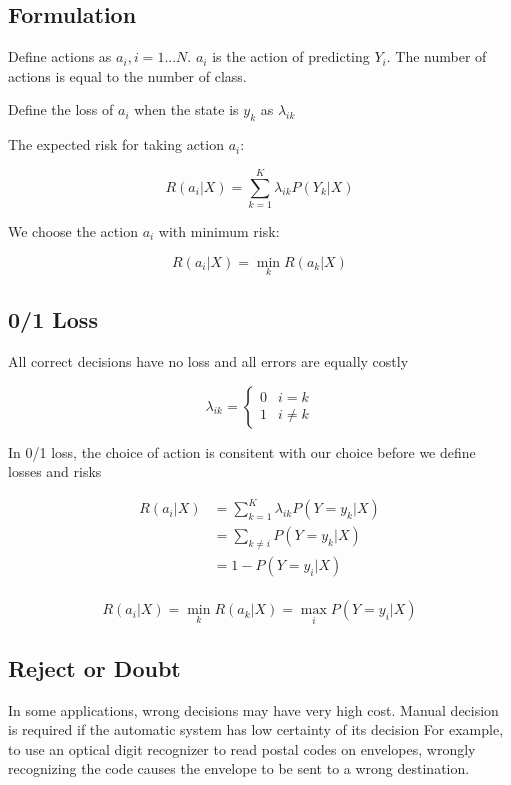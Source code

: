 \begin{multicols}{2}
\subsection{Formulation}

\noindent Define actions as $a_{i}, i=1...N$. $a_{i}$ is the action of predicting $Y_{i}$. The number of actions is equal to the number of class. 

\noindent Define the loss of $a_{i}$ when the state is $y_{k}$ as $\lambda_{ik}$

\noindent The expected risk for taking action $a_{i}$:

$$R(a_{i} | X) = \sum^{K}_{k=1} \lambda_{ik} P(Y_{k} | X)$$

\noindent We choose the action $a_{i}$ with minimum risk:

$$R(a_{i}|X) = \!\min_{k} R(a_{k}|X)$$

\subsection{0/1 Loss}

\noindent All correct decisions have no loss and all errors are equally costly

$$
\lambda_{ik} = 
\begin{cases}
0 & i=k\\
1 & i \ne k
\end{cases}
$$

\noindent In 0/1 loss, the choice of action is consitent with our choice before we define losses and risks

\begin{equation*}
\begin{split}
    R(a_i | X) &= \sum_{k=1}^K \lambda_{ik} P(Y=y_k|X) \\
    &= \sum_{k \ne i} P(Y=y_k | X) \\
    &= 1-P(Y=y_i|X) \\
\end{split}
\end{equation*}

$$R(a_i|X) = \!\min_{k} R(a_k|X) = \!\max_i P(Y=y_i|X)$$

\subsection{Reject or Doubt}
In some applications, wrong decisions may have very high cost. Manual decision is required if the automatic system has low certainty of its decision For example, to use an optical digit recognizer to read postal codes on envelopes, wrongly recognizing the code causes the envelope to be sent to a wrong destination.


\end{multicols}
